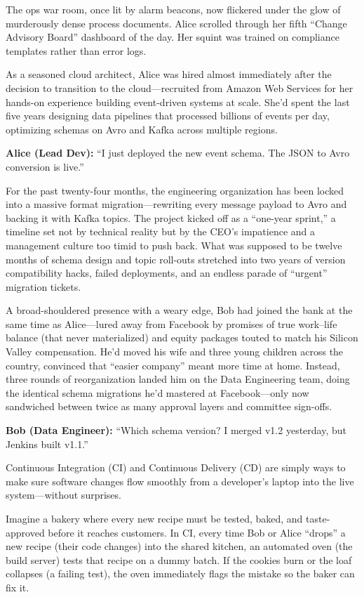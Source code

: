 The ops war room, once lit by alarm beacons, now flickered under the glow of  
murderously dense process documents. Alice scrolled through her fifth 
“Change Advisory Board” dashboard of the  
day. Her squint was trained on compliance templates rather than error logs.

As a seasoned cloud architect, Alice was hired almost immediately after the  
decision to transition to the cloud—recruited from Amazon Web Services for her  
hands-on experience building event-driven systems at scale. She’d spent the  
last five years designing data pipelines that processed billions of events per  
day, optimizing schemas on Avro and Kafka across multiple regions.

\textbf{Alice (Lead Dev):} “I just deployed the new event schema. The JSON to  
Avro conversion is live.”

For the past twenty-four months, the engineering organization has been locked  
into a massive format migration—rewriting every message payload to Avro and  
backing it with Kafka topics. The project kicked off as a “one-year sprint,”  
a timeline set not by technical reality but by the CEO’s impatience and a  
management culture too timid to push back. What was supposed to be twelve  
months of schema design and topic roll-outs stretched into two years of  
version compatibility hacks, failed deployments, and an endless parade of  
“urgent” migration tickets.  

A broad-shouldered presence with a weary edge, Bob had joined the bank at the  
same time as Alice—lured away from Facebook by promises of true work–life balance  
(that never materialized) and equity packages touted to match his Silicon Valley  
compensation. He’d moved his wife and three young children across the country,  
convinced that “easier company” meant more time at home. Instead, three rounds  
of reorganization landed him on the Data Engineering team, doing the identical  
schema migrations he’d mastered at Facebook—only now sandwiched between twice  
as many approval layers and committee sign-offs.

\textbf{Bob (Data Engineer):} “Which schema version? I merged v1.2 yesterday,  
but Jenkins built v1.1.”

Continuous Integration (CI) and Continuous Delivery (CD) are simply ways to make 
sure software changes flow smoothly from a developer’s laptop into the live 
system—without surprises.

Imagine a bakery where every new recipe must be tested, baked, and taste-approved 
before it reaches customers. In CI, every time Bob or Alice “drops” a new 
recipe (their code changes) into the shared kitchen, an automated oven 
(the build server) tests that recipe on a dummy batch. If the cookies burn 
or the loaf collapses (a failing test), the oven immediately flags the 
mistake so the baker can fix it.

